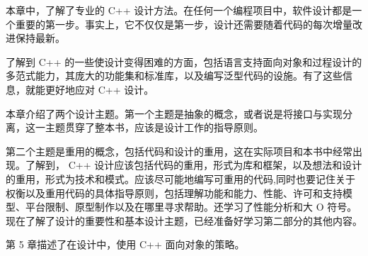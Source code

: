 本章中，了解了专业的 C++ 设计方法。在任何一个编程项目中，软件设计都是一个重要的第一步。事实上，它不仅仅是第一步，设计还需要随着代码的每次增量改进保持最新。

了解到 C++ 的一些使设计变得困难的方面，包括语言支持面向对象和过程设计的多范式能力，其庞大的功能集和标准库，以及编写泛型代码的设施。有了这些信息，就能更好地应对 C++ 设计。

本章介绍了两个设计主题。第一个主题是抽象的概念，或者说是将接口与实现分离，这一主题贯穿了整本书，应该是设计工作的指导原则。

第二个主题是重用的概念，包括代码和设计的重用，这在实际项目和本书中经常出现。了解到， C++ 设计应该包括代码的重用，形式为库和框架，以及想法和设计的重用，形式为技术和模式。应该尽可能地编写可重用的代码,同时也要记住关于权衡以及重用代码的具体指导原则，包括理解功能和能力、性能、许可和支持模型、平台限制、原型制作以及在哪里寻求帮助。还学习了性能分析和大 O 符号。现在了解了设计的重要性和基本设计主题，已经准备好学习第二部分的其他内容。

第 5 章描述了在设计中，使用 C++ 面向对象的策略。